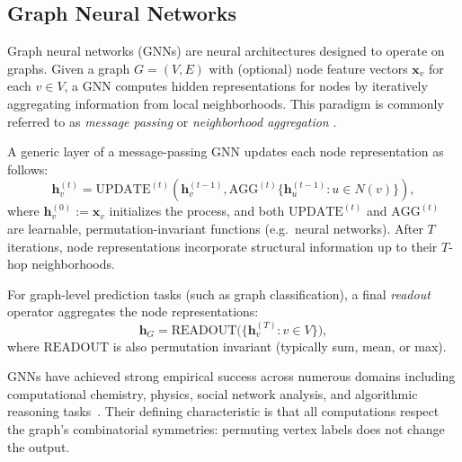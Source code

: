 


\subsection{Graph Neural Networks}
\label{subsec:GNNs}

Graph neural networks (GNNs) are neural architectures designed to operate on graphs.
Given a graph $G = (V,E)$ with (optional) node feature vectors $\mathbf{x}_v$ for each
$v \in V$, a GNN computes hidden representations for nodes by iteratively aggregating
information from local neighborhoods. This paradigm is commonly referred to as
\emph{message passing} or \emph{neighborhood aggregation}
\cite{HamiltonYingLeskovec2017b, KipfWelling2017, GilmerEtAl2017}.

A generic layer of a message-passing GNN updates each node representation as follows:
\[
\mathbf{h}_v^{(t)} = 
\mathrm{UPDATE}^{(t)} \!\left(
    \mathbf{h}_v^{(t-1)},
    \mathrm{AGG}^{(t)}\bigl\{ \mathbf{h}_u^{(t-1)} : u \in N(v) \bigr\}
\right),
\]
where $\mathbf{h}_v^{(0)} := \mathbf{x}_v$ initializes the process,
and both $\mathrm{UPDATE}^{(t)}$ and $\mathrm{AGG}^{(t)}$ are learnable,
permutation-invariant functions (e.g.\ neural networks).
After $T$ iterations, node representations incorporate structural information up to
their $T$-hop neighborhoods.

For graph-level prediction tasks (such as graph classification),
a final \emph{readout} operator aggregates the node representations:
\[
\mathbf{h}_G 
    = \mathrm{READOUT}\bigl(\{\mathbf{h}_v^{(T)} : v \in V\}\bigr),
\]
where $\mathrm{READOUT}$ is also permutation invariant (typically sum, mean, or max).

GNNs have achieved strong empirical success across numerous domains including
computational chemistry, physics, social network analysis, and algorithmic reasoning
tasks~\cite{BronsteinEtAl2021, BattagliaEtAl2018}.
Their defining characteristic is that all computations respect the
graph’s combinatorial symmetries: permuting vertex labels does not change the output.

